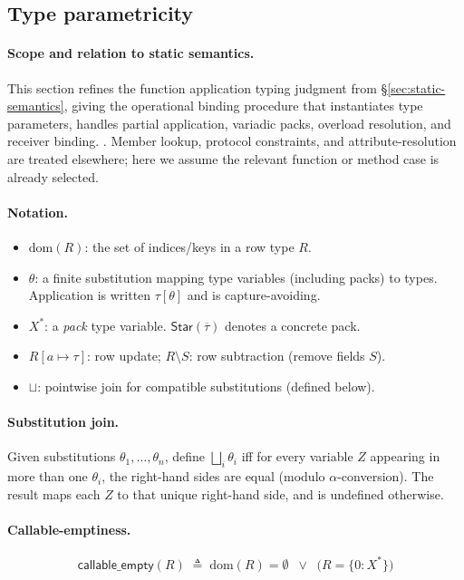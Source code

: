 \subsection{Type parametricity}
\label{appendix:type-parametricity}

\paragraph{Scope and relation to static semantics.}
This section refines the function application typing judgment from \S\ref{sec:static-semantics}, giving the operational binding procedure that instantiates type parameters, handles partial application, variadic packs, overload resolution, and receiver binding.
. Member lookup, protocol constraints, and attribute-resolution are treated
elsewhere; here we assume the relevant function or method case is already selected.

\paragraph{Notation.}
\begin{itemize}
  \item $\mathrm{dom}(R)$: the set of indices/keys in a row type $R$.
  \item $\theta$: a finite substitution mapping type variables (including packs) to types.
        Application is written $\tau[\theta]$ and is capture-avoiding.
  \item $X^*$: a \emph{pack} type variable. $\mathsf{Star}(\overline{\tau})$ denotes a concrete pack.
  \item $R[a \mapsto \tau]$: row update; $R \setminus S$: row subtraction (remove fields $S$).
  \item $\sqcup$: pointwise join for compatible substitutions (defined below).
\end{itemize}

\paragraph{Substitution join.}
Given substitutions $\theta_1,\ldots,\theta_n$, define
$\bigsqcup_i \theta_i$ iff for every variable $Z$ appearing in more than one $\theta_i$,
the right-hand sides are equal (modulo $\alpha$-conversion). The result maps each $Z$
to that unique right-hand side, and is undefined otherwise.

\paragraph{Callable-emptiness.}
\[
\mathsf{callable\_empty}(R) \;\triangleq\; \mathrm{dom}(R)=\emptyset \;\;\lor\;\;
\bigl(R=\{0:X^*\}\bigr)
\]

